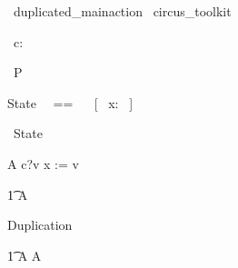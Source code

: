 
\begin{zsection}
  \SECTION\ duplicated\_mainaction \parents\ circus\_toolkit
\end{zsection}

\begin{circus}
    \circchannel\ c: \nat
\end{circus}
\begin{circus}
    \circprocess\ P \circdef \circbegin
\end{circus}

\begin{zed}
    State ~~== ~~ [~ x: \nat ~]
\end{zed}

\begin{circusaction}
    \circstate\  State
\end{circusaction}

\begin{circusaction}
   A \circdef c?v \then x := v \\
\end{circusaction}

\begin{circusaction}
    \t1 \circspot A
\end{circusaction}

Duplication
%
\begin{circusaction}
    \t1 \circspot A \circseq A
\end{circusaction}


\begin{circus}
    \circend
\end{circus}
